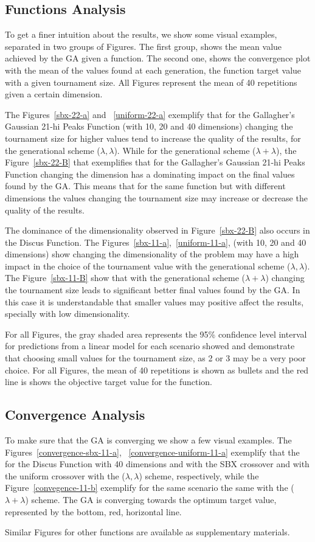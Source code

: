 \subsection{Functions Analysis}

To get a finer intuition about the results, we show some visual examples, separated in two groups of Figures. The first group, shows the mean value achieved by the GA given a function. The second one, shows the convergence plot with the mean of the values found at each generation, the function target value with a given tournament size. All Figures represent the mean of 40 repetitions given a certain dimension.


The Figures~\ref{sbx-22-a} and ~\ref{uniform-22-a} exemplify that for the Gallagher's Gaussian 21-hi Peaks Function (with 10, 20 and 40 dimensions) changing the tournament size for higher values tend to increase the quality of the results, for the generational scheme ($\lambda, \lambda$). While for the generational scheme ($\lambda + \lambda$), the Figure~\ref{sbx-22-B} that exemplifies that for the Gallagher's Gaussian 21-hi Peaks Function changing the dimension has a dominating impact on the final values found by the GA. This means that for the same function but with different dimensions the values changing the tournament size may increase or decrease the quality of the results.

The dominance of the dimensionality observed in Figure~\ref{sbx-22-B} also occurs in the Discus Function. The Figures~\ref{sbx-11-a},~\ref{uniform-11-a}, (with 10, 20 and 40 dimensions) show  changing the dimensionality of the problem may have a high impact in the choice of the tournament value with the generational scheme ($\lambda, \lambda$). The Figure~\ref{sbx-11-B} show that with the generational scheme ($\lambda + \lambda$) changing the tournament size leads to significant better final values found by the GA. In this case it is understandable that smaller values may positive affect the results, specially with low dimensionality. 

For all Figures, the gray shaded area represents the 95\% confidence level interval for predictions from a linear model for each scenario showed and demonstrate that choosing small values for the tournament size, as 2 or 3 may be a very poor choice. For all Figures, the mean of 40 repetitions is shown as bullets and the red line is shows the objective target value for the function.


\subsection{Convergence Analysis}
To make sure that the GA is converging we show a few visual examples. The Figures~\ref{convergence-sbx-11-a}, ~\ref{convergence-uniform-11-a} exemplify that the for the Discus Function with 40 dimensions and with the SBX crossover and with the uniform crossover with the ($\lambda, \lambda$) scheme, respectively, while the Figure~\ref{convegence-11-b} exemplify for the same scenario the same with the ($\lambda + \lambda$) scheme. The GA is converging towards the optimum target value, represented by the bottom, red, horizontal line.


Similar Figures for other functions are available as supplementary materials.

